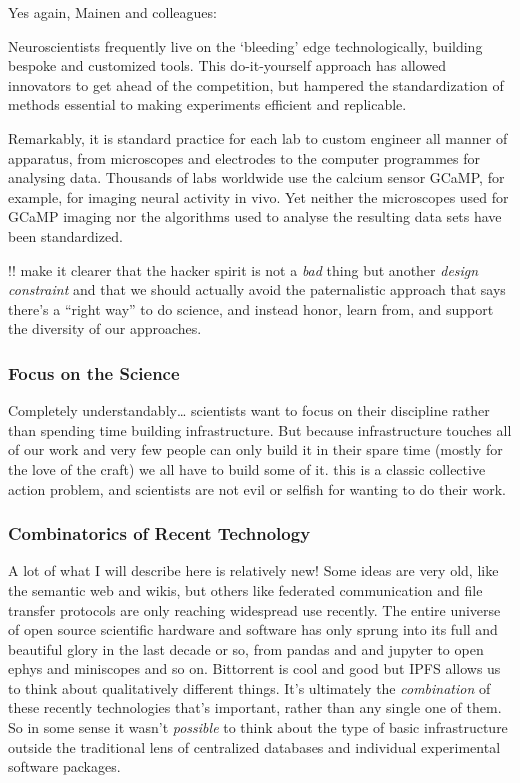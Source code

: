 \documentclass[11pt]{article}
\begin{document}
\begin{multicols}{2}
Yes again, Mainen and colleagues:

\begin{leftbar}
Neuroscientists frequently live on the `bleeding' edge technologically,
building bespoke and customized tools. This do-it-yourself approach has
allowed innovators to get ahead of the competition, but hampered the
standardization of methods essential to making experiments efficient and
replicable.

Remarkably, it is standard practice for each lab to custom engineer all
manner of apparatus, from microscopes and electrodes to the computer
programmes for analysing data. Thousands of labs worldwide use the
calcium sensor GCaMP, for example, for imaging neural activity in vivo.
Yet neither the microscopes used for GCaMP imaging nor the algorithms
used to analyse the resulting data sets have been standardized. \cite{mainenBetterWayCrack2016} 
\end{leftbar}

!! make it clearer that the hacker spirit is not a \emph{bad} thing but
another \emph{design constraint} and that we should actually avoid the
paternalistic approach that says there's a ``right way'' to do science,
and instead honor, learn from, and support the diversity of our
approaches.

\hypertarget{focus-on-the-science}{%
\subsubsection{Focus on the Science}\label{focus-on-the-science}}

Completely understandably\ldots{} scientists want to focus on their
discipline rather than spending time building infrastructure. But
because infrastructure touches all of our work and very few people can
only build it in their spare time (mostly for the love of the craft) we
all have to build some of it. this is a classic collective action
problem, and scientists are not evil or selfish for wanting to do their
work.

\hypertarget{combinatorics-of-recent-technology}{%
\subsubsection{Combinatorics of Recent
Technology}\label{combinatorics-of-recent-technology}}

A lot of what I will describe here is relatively new! Some ideas are
very old, like the semantic web and wikis, but others like federated
communication and file transfer protocols are only reaching widespread
use recently. The entire universe of open source scientific hardware and
software has only sprung into its full and beautiful glory in the last
decade or so, from pandas and and jupyter to open ephys and miniscopes
and so on. Bittorrent is cool and good but IPFS allows us to think about
qualitatively different things. It's ultimately the \emph{combination}
of these recently technologies that's important, rather than any single
one of them. So in some sense it wasn't \emph{possible} to think about
the type of basic infrastructure outside the traditional lens of
centralized databases and individual experimental software packages.


\end{multicols}
\end{document}
